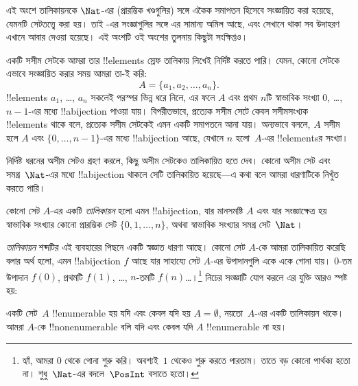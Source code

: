 \documentclass[../../../include/open-logic-section]{subfiles}
\begin{document}


\begin{editorial}
  এই অংশে তালিকায়নকে $\Nat$-এর (প্রারম্ভিক খণ্ডগুলির) সঙ্গে একৈক সমাপতন হিসেবে সংজ্ঞায়িত করা হয়েছে, যেমনটি সেটতত্ত্বে করা হয়। তাই -এর সংজ্ঞাগুলির সঙ্গে এর সামান্য অমিল আছে, এবং সেখানে থাকা সব উদাহরণ এখানে আবার দেওয়া হয়েছে। এই অংশটি ওই অংশের তুলনায় কিছুটা সংক্ষিপ্তও।
\end{editorial}

একটি সসীম সেটকে আমরা তার !!{element}s স্রেফ তালিকায় লিখেই নির্দিষ্ট করতে পারি। যেমন, কোনো সেটকে এভাবে সংজ্ঞায়িত করার সময় আমরা তা-ই করি:
\[
  A = \{a_1, a_2, \ldots, a_n\}.
\]
!!{element}s $a_1$, \dots, $a_n$ সকলেই পরস্পর ভিন্ন ধরে নিলে, এর ফলে $A$ এবং প্রথম $n$টি স্বাভাবিক সংখ্যা $0$, \dots, $n-1$-এর মধ্যে !!a{bijection} পাওয়া যায়। বিপরীতভাবে, প্রত্যেক সসীম সেটে কেবল সসীমসংখ্যক !!{element}s থাকে বলে, প্রত্যেক সসীম সেটকেই এমন একটি সমাপতনে আনা যায়। অন্যভাবে বললে, $A$ সসীম হলে $A$ এবং $\{0, \dots, n-1\}$-এর মধ্যে !!a{bijection} আছে, যেখানে $n$ হলো~$A$-এর !!{element}sর সংখ্যা।

নির্দিষ্ট ধরনের অসীম সেটও গ্রহণ করলে, কিছু অসীম সেটকেও তালিকায়িত হতে দেব। কোনো অসীম সেট এবং সমগ্র~$\Nat$-এর মধ্যে !!a{bijection} থাকলে সেটি তালিকায়িত হয়েছে—এ কথা বলে আমরা ধারণাটিকে নিখুঁত করতে পারি।

\begin{defn}[তালিকায়ন, সেটতাত্ত্বিকভাবে]
কোনো সেট $A$-এর একটি \emph{তালিকায়ন} হলো এমন !!a{bijection}, যার মানসমষ্টি $A$ এবং যার সংজ্ঞাক্ষেত্র হয় স্বাভাবিক সংখ্যার কোনো প্রারম্ভিক সেট $\{0, 1, \ldots, n\}$, {অথবা} স্বাভাবিক সংখ্যার সমগ্র সেট~$\Nat$।
\end{defn}

\begin{explain}
\emph{তালিকায়ন} শব্দটির এই ব্যবহারের পিছনে একটি স্বজ্ঞাত ধারণা আছে। কোনো সেট $A$-কে আমরা তালিকায়িত করেছি বলার অর্থ হলো, এমন !!a{bijection} $f$ আছে যার সাহায্যে সেট $A$-এর উপাদানগুলি একে একে গোনা যায়। $0$-তম উপাদান $f(0)$, প্রথমটি $f(1)$, \ldots, $n$-তমটি $f(n)$\ldots।\footnote{হ্যাঁ, আমরা $0$ থেকে গোনা শুরু করি। অবশ্যই~$1$ থেকেও শুরু করতে পারতাম। তাতে বড় কোনো পার্থক্য হতো না। শুধু~$\Nat$-এর বদলে~$\PosInt$ বসাতে হতো।} নিচের সংজ্ঞাটি যোগ করলে এর যুক্তি আরও স্পষ্ট হয়:
\end{explain}

\begin{defn}
  একটি সেট~$A$ !!{enumerable} হয় যদি এবং কেবল যদি হয় $A = \emptyset$, নয়তো~$A$-এর একটি তালিকায়ন থাকে। আমরা $A$-কে !!{nonenumerable} বলি যদি এবং কেবল যদি $A$ !!{enumerable} না হয়।
\end{defn}
\end{document}
